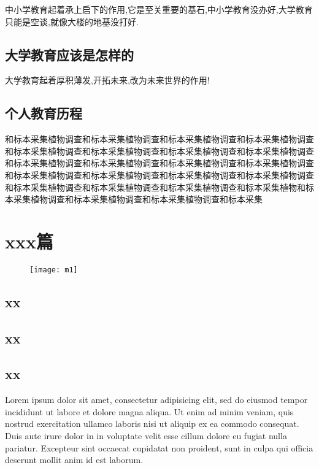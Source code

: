 \documentclass[utf8]{book}
\begin{document}
中小学教育起着承上启下的作用,它是至关重要的基石,中小学教育没办好,大学教育只能是空谈,就像大楼的地基没打好.

\chapter{大学教育应该是怎样的}

大学教育起着厚积薄发,开拓未来,改为未来世界的作用!

\chapter{个人教育历程}





\begin{multicols}{2}
和标本采集植物调查和标本采集植物调查和标本采集植物调查和标本采集植物调查和标本采集植物调查和标本采集植物调查和标本采集植物调查和标本采集植物调查和标本采集植物调查和标本采集植物调查和标本采集植物调查和标本采集植物调查和标本采集植物调查和标本采集植物调查和标本采集植物调查和标本采集植物调查和标本采集植物调查和标本采集植物调查和标本采集植物调查和标本采集植物和标本采集植物调查和标本采集植物调查和标本采集植物调查和标本采集

\end{multicols}

\part{xxx篇}

	\begin{figure}[H]
	\centering
	\texttt{[image: m1]}
	\end{figure}
	
\chapter{xx}
\chapter{xx}
\chapter{xx}

\begin{multicols}{2}
Lorem ipsum dolor sit amet, consectetur adipisicing elit, sed do eiusmod tempor incididunt ut labore et dolore magna aliqua. Ut enim ad minim veniam, quis nostrud exercitation ullamco laboris nisi ut aliquip ex ea commodo consequat. Duis aute irure dolor in  in voluptate velit esse cillum dolore eu fugiat nulla pariatur. Excepteur sint occaecat cupidatat non proident, sunt in culpa qui officia deserunt mollit anim id est laborum.
\end{multicols}
\end{document}
